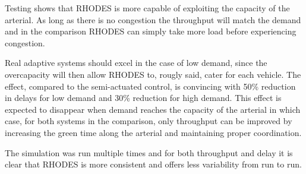 Testing shows that RHODES is more capable of exploiting the capacity of the arterial. As long as there is no congestion the throughput will match the demand and in the comparison RHODES can simply take more load before experiencing congestion.

Real adaptive systems should excel in the case of low demand, since the overcapacity will then allow RHODES to, rougly said, cater for each vehicle. The effect, compared to the semi-actuated control, is convincing with 50\% reduction in delays for low demand and 30\% reduction for high demand. This effect is expected to disappear when demand reaches the capacity of the arterial in which case, for both systems in the comparison, only throughput can be improved by increasing the green time along the arterial and maintaining proper coordination.

The simulation was run multiple times and for both throughput and delay it is clear that RHODES is more consistent and offers less variability from run to run.
